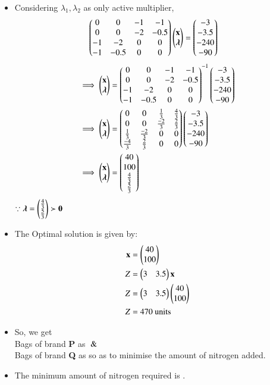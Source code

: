 \documentclass[journal,12pt,twocolumn]{IEEEtran}
\begin{document}
\begin{itemize}
\begin{align}
\end{align}
\item Considering $\lambda_1,\lambda_2$ as only active multiplier,
\begin{align}
    \begin{pmatrix}0 & 0 & -1 & -1  \\ 0 & 0 & -2 & -0.5 \\ -1 & -2 & 0 & 0 \\-1 & -0.5 & 0 & 0\end{pmatrix}\begin{pmatrix}\mathbf{x}\\ \boldsymbol{\lambda}\end{pmatrix} &= \begin{pmatrix}-3 \\ -3.5 \\ -240 \\ -90\end{pmatrix}
\end{align}
\begin{align}
 \implies   \begin{pmatrix}\mathbf{x} \\ \boldsymbol{\lambda}\end{pmatrix} &=  \begin{pmatrix}0 & 0 & -1 & -1  \\ 0 & 0 & -2 & -0.5 \\ -1 & -2 & 0 & 0 \\-1 & -0.5 & 0 & 0\end{pmatrix}^{-1}\begin{pmatrix}-3 \\ -3.5 \\ -240 \\ -90\end{pmatrix}
    \\
    \implies   \begin{pmatrix}\mathbf{x} \\ \boldsymbol{\lambda}\end{pmatrix} &= \begin{pmatrix}0 & 0 & \frac{1}{3} & \frac{4}{3} \\ 0 & 0 & \frac{-2}{3} & \frac{2}{3} \\ \frac{1}{3} & \frac{-2}{3} & 0 & 0 \\ \frac{-4}{3} & \frac{2}{3} & 0 & 0\end{pmatrix}\begin{pmatrix}-3 \\ -3.5 \\ -240 \\ -90\end{pmatrix}
    \\
    \implies \begin{pmatrix}\mathbf{x} \\ \boldsymbol{\lambda}\end{pmatrix} &= \begin{pmatrix}40 \\100 \\ \frac{4}{3} \\ \frac{5}{3} \end{pmatrix}
\end{align}
$\because \boldsymbol{\lambda}=\begin{pmatrix}\frac{4}{3} \\ \frac{5}{3}\end{pmatrix} \succ \mathbf{0} $
\\
\item The Optimal solution is given by:
\begin{align}
    \mathbf{x} &= \begin{pmatrix}40\\100\end{pmatrix} \\
    Z &= \begin{pmatrix}3&3.5\end{pmatrix}\mathbf{x} \\
   Z &= \begin{pmatrix}3&3.5\end{pmatrix}\begin{pmatrix}40 \\ 100\end{pmatrix} \\
    Z&= 470 \text{ units}
\end{align}
\item So, we get
\\
 Bags of brand \textbf{P} as  $\And$
 \\
 Bags of brand \textbf{Q} as   so as to minimise the amount of nitrogen added.
\item The minimum amount of nitrogen required is  .


\end{itemize}
\end{document}

